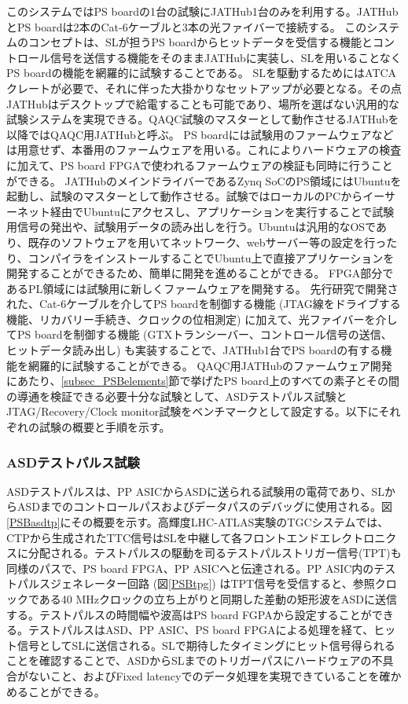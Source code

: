 このシステムではPS boardの1台の試験にJATHub1台のみを利用する。JATHubとPS boardは2本のCat-6ケーブルと3本の光ファイバーで接続する。
このシステムのコンセプトは、SLが担うPS boardからヒットデータを受信する機能とコントロール信号を送信する機能をそのままJATHubに実装し、SLを用いることなくPS boardの機能を網羅的に試験することである。
SLを駆動するためにはATCAクレートが必要で、それに伴った大掛かりなセットアップが必要となる。その点JATHubはデスクトップで給電することも可能であり、場所を選ばない汎用的な試験システムを実現できる。QAQC試験のマスターとして動作させるJATHubを以降ではQAQC用JATHubと呼ぶ。
PS boardには試験用のファームウェアなどは用意せず、本番用のファームウェアを用いる。これによりハードウェアの検査に加えて、PS board FPGAで使われるファームウェアの検証も同時に行うことができる。
JATHubのメインドライバーであるZynq SoCのPS領域にはUbuntuを起動し、試験のマスターとして動作させる。試験ではローカルのPCからイーサーネット経由でUbuntuにアクセスし、アプリケーションを実行することで試験用信号の発出や、試験用データの読み出しを行う。Ubuntuは汎用的なOSであり、既存のソフトウェアを用いてネットワーク、webサーバー等の設定を行ったり、コンパイラをインストールすることでUbuntu上で直接アプリケーションを開発することができるため、簡単に開発を進めることができる。
FPGA部分であるPL領域には試験用に新しくファームウェアを開発する。
先行研究で開発された、Cat-6ケーブルを介してPS boardを制御する機能 (JTAG線をドライブする機能、リカバリー手続き、クロックの位相測定) に加えて、光ファイバーを介してPS boardを制御する機能 (GTXトランシーバー、コントロール信号の送信、ヒットデータ読み出し) も実装することで、JATHub1台でPS boardの有する機能を網羅的に試験することができる。
QAQC用JATHubのファームウェア開発にあたり、\ref{subsec_PSBelements}節で挙げたPS board上のすべての素子とその間の導通を検証できる必要十分な試験として、ASDテストパルス試験とJTAG/Recovery/Clock monitor試験をベンチマークとして設定する。以下にそれぞれの試験の概要と手順を示す。

\subsubsection{ASDテストパルス試験}
\label{subsubsec_testpulse}
\baselineskip

ASDテストパルスは、PP ASICからASDに送られる試験用の電荷であり、SLからASDまでのコントロールパスおよびデータパスのデバッグに使用される。図\ref{PSBasdtp}にその概要を示す。高輝度LHC-ATLAS実験のTGCシステムでは、CTPから生成されたTTC信号はSLを中継して各フロントエンドエレクトロニクスに分配される。テストパルスの駆動を司るテストパルストリガー信号(TPT)も同様のパスで、PS board FPGA、PP ASICへと伝達される。PP ASIC内のテストパルスジェネレーター回路 (図\ref{PSBtpg}) はTPT信号を受信すると、参照クロックである40 MHzクロックの立ち上がりと同期した差動の矩形波をASDに送信する。テストパルスの時間幅や波高はPS board FGPAから設定することができる。テストパルスはASD、PP ASIC、PS board FPGAによる処理を経て、ヒット信号としてSLに送信される。SLで期待したタイミングにヒット信号得られることを確認することで、ASDからSLまでのトリガーパスにハードウェアの不具合がないこと、およびFixed latencyでのデータ処理を実現できていることを確かめることができる。
\baselineskip

